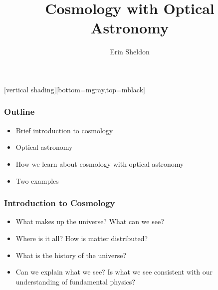 \documentclass{beamer}
\title{Cosmology with Optical Astronomy}
\author{Erin Sheldon}
\institute{Brookhaven National Laboratory}
\begin{document}
\frame
{
}
[vertical shading][bottom=mgray,top=mblack]



\frame{\titlepage}




\frame
{
    \frametitle{Outline}


    \begin{itemize}

        \item Brief introduction to cosmology
        \item Optical astronomy
        \item How we learn about cosmology with optical astronomy
        \item Two examples

    \end{itemize}

}

\frame
{
    \frametitle{Introduction to Cosmology}


    \begin{itemize}

        \item What makes up the universe? What can we see?

        \item Where is it all?  How is matter distributed?

        \item What is the history of the universe?

        \item Can we explain what we see?  Is what we see consistent with our
            understanding of fundamental physics?

    \end{itemize}

}
\end{document}
